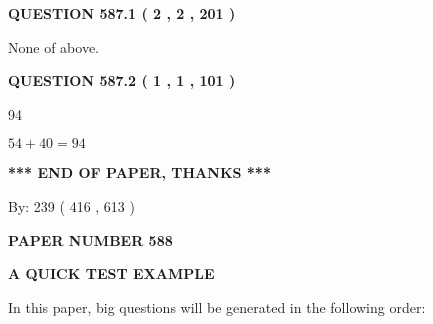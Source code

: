 \documentclass[12pt]{article}
\begin{document}
{\textbf{\Large{QUESTION
587.1 
 ( 2 , 2 , 201 )
}}}
  
  
 
 
\noindent{}
 
 
 None of above.
 
 
 
 
  
\vspace{0.2in}
  
{\textbf{\Large{QUESTION
587.2 
 ( 1 , 1 , 101 )
}}}
  
  
 
 
\noindent{}

94
 
 
 
 
\noindent{}

$ %
54 +  %
40=   %
94$
 
 
   
   
 \vspace{0.2in}
 
   
   
   
   
\vspace{1.0in} 
{\textbf{\large{ *** END OF PAPER, THANKS *** }}} 
   
   
\hspace{1.0in} By: 
 239 ( 416 ,  613 )
   
   
   
   
\newpage 
\setcounter{page}{ 
   588001 } 
   
   
   
   
 {\textbf{ \Large{ PAPER NUMBER  588  }}}
   
   
\vspace{0.2in}
   
   
   
   
   
   
 \vspace{0.2in}
{\LARGE {\textbf{ A QUICK TEST EXAMPLE}}}
   
   
   
\vspace{0.2in}
   
In this paper, big questions will be generated in the following order: 
   
\end{document}

